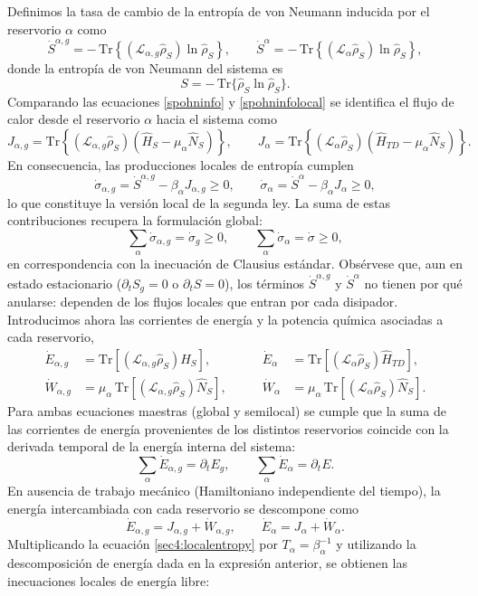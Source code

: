 Definimos la tasa de cambio de la entropía de von Neumann inducida por el reservorio $\alpha$ como
\[
\dot{S}^{\alpha,g}
= -\,\mathrm{Tr}\!\left\{(\mathcal{L}_{\alpha,g}\hat{\rho}_{S})\ln\hat{\rho}_{S}\right\},
\qquad
\dot{S}^{\alpha}
= -\,\mathrm{Tr}\!\left\{(\mathcal{L}_{\alpha}\hat{\rho}_{S})\ln\hat{\rho}_{S}\right\},
\]
donde la entropía de von Neumann del sistema es
\[
S=-\,\mathrm{Tr}\{\hat{\rho}_{S}\ln\hat{\rho}_{S}\}.
\]
Comparando las ecuaciones \eqref{spohninfo} y \eqref{spohninfolocal} se identifica el flujo de calor desde el reservorio $\alpha$ hacia el sistema como
\[
J_{\alpha,g}
=\mathrm{Tr}\!\left\{(\mathcal{L}_{\alpha,g}\hat{\rho}_{S})
(\hat{H}_{S}-\mu_{\alpha}\hat{N}_{S})\right\},
\qquad
J_{\alpha}
=\mathrm{Tr}\!\left\{(\mathcal{L}_{\alpha}\hat{\rho}_{S})
(\hat{H}_{TD}-\mu_{\alpha}\hat{N}_{S})\right\}.
\]
En consecuencia, las producciones locales de entropía cumplen
\begin{equation}
    \dot{\sigma}_{\alpha,g}=\dot{S}^{\alpha,g}-\beta_{\alpha}J_{\alpha,g}\ge 0,
    \qquad
    \dot{\sigma}_{\alpha}=\dot{S}^{\alpha}-\beta_{\alpha}J_{\alpha}\ge 0,
    \label{sec4:localentropy}
\end{equation}
lo que constituye la versión local de la segunda ley. La suma de estas contribuciones recupera la formulación global:
\[
\sum_{\alpha}\dot{\sigma}_{\alpha,g}
=\dot{\sigma}_{g}\ge 0,
\qquad
\sum_{\alpha}\dot{\sigma}_{\alpha}
=\dot{\sigma}\ge 0,
\]
en correspondencia con la inecuación de Clausius estándar. Obsérvese que, aun en estado estacionario
($\partial_{t}S_{g}=0$ o $\partial_{t}S=0$), los términos
$\dot{S}^{\alpha,g}$ y $\dot{S}^{\alpha}$ no tienen por qué anularse: dependen de los flujos locales que entran por cada disipador.
\\

Introducimos ahora las corrientes de energía y la potencia química asociadas a cada reservorio,
\begin{align*}
    \dot{E}_{\alpha,g}
    &= \mathrm{Tr}\!\left[(\mathcal{L}_{\alpha,g}\hat{\rho}_{S})\hat{H}_{S}\right],
    &\qquad
    \dot{E}_{\alpha}
    &= \mathrm{Tr}\!\left[(\mathcal{L}_{\alpha}\hat{\rho}_{S})\hat{H}_{TD}\right],\\[2pt]
    \dot{W}_{\alpha,g}
    &= \mu_{\alpha}\,\mathrm{Tr}\!\left[(\mathcal{L}_{\alpha,g}\hat{\rho}_{S})\hat{N}_{S}\right],
    &\qquad
    \dot{W}_{\alpha}
    &= \mu_{\alpha}\,\mathrm{Tr}\!\left[(\mathcal{L}_{\alpha}\hat{\rho}_{S})\hat{N}_{S}\right].
\end{align*}
Para ambas ecuaciones maestras (global y semilocal) se cumple que la suma de las corrientes de energía provenientes de los distintos reservorios coincide con la derivada temporal de la energía interna del sistema:
\[
\sum_{\alpha}\dot{E}_{\alpha,g}=\partial_{t}E_{g},
\qquad
\sum_{\alpha}\dot{E}_{\alpha}=\partial_{t}E.
\]
En ausencia de trabajo mecánico (Hamiltoniano independiente del tiempo), la energía intercambiada con cada reservorio se descompone como
\[
\dot{E}_{\alpha,g}=J_{\alpha,g}+\dot{W}_{\alpha,g},
\qquad
\dot{E}_{\alpha}=J_{\alpha}+\dot{W}_{\alpha}.
\]
Multiplicando la ecuación \eqref{sec4:localentropy} por $T_{\alpha}=\beta_{\alpha}^{-1}$ y utilizando la descomposición de energía dada en la expresión anterior, se obtienen las inecuaciones locales de energía libre:

